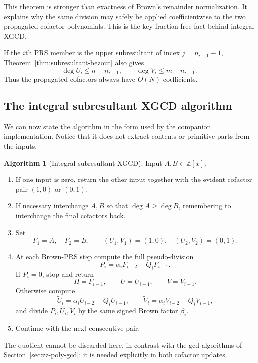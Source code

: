\documentclass[11pt]{book}
\theoremstyle{definition}
\newtheorem{algorithm}[theorem]{Algorithm}
\newcommand{\ZZ}{\mathbb Z}
\begin{document}
This theorem is stronger than exactness of Brown's remainder normalization.
It explains why the same division may safely be applied coefficientwise to
the two propagated cofactor polynomials.  This is the key fraction-free fact
behind integral XGCD.

If the $i$th PRS member is the upper subresultant of index
$j=n_{i-1}-1$, Theorem~\ref{thm:subresultant-bezout} also gives
\begin{equation}\label{eq:xgcd-cofactor-degree-bounds}
 \deg U_i\le n-n_{i-1},
 \qquad
 \deg V_i\le m-n_{i-1}.
\end{equation}
Thus the propagated cofactors always have $O(N)$ coefficients.

\subsection{The integral subresultant XGCD algorithm}

We can now state the algorithm in the form used by the companion
implementation.  Notice that it does not extract contents or primitive parts
from the inputs.

\begin{algorithm}[Integral subresultant XGCD]
\label{alg:subresultant-xgcd}
Input $A,B\in\ZZ[x]$.
\begin{enumerate}
 \item If one input is zero, return the other input together with the evident
 cofactor pair $(1,0)$ or $(0,1)$.
 \item If necessary interchange $A,B$ so that $\deg A\ge\deg B$, remembering
 to interchange the final cofactors back.
 \item Set
 \[
  F_1=A,\quad F_2=B,
  \qquad
  (U_1,V_1)=(1,0),\quad (U_2,V_2)=(0,1).
 \]
 \item At each Brown-PRS step compute the full pseudo-division
 \[
  P_i=\alpha_iF_{i-2}-Q_iF_{i-1}.
 \]
 If $P_i=0$, stop and return
 \[
  H=F_{i-1},\qquad U=U_{i-1},\qquad V=V_{i-1}.
 \]
 Otherwise compute
 \[
  \widetilde U_i=\alpha_iU_{i-2}-Q_iU_{i-1},
  \qquad
  \widetilde V_i=\alpha_iV_{i-2}-Q_iV_{i-1},
 \]
 and divide $P_i,\widetilde U_i,\widetilde V_i$ by the same signed Brown
 factor $\beta_i$.
 \item Continue with the next consecutive pair.
\end{enumerate}
\end{algorithm}

The quotient cannot be discarded here, in contrast with the gcd algorithms
of Section~\ref{sec:zz-poly-gcd}: it is needed explicitly in both cofactor
updates.
\end{document}
